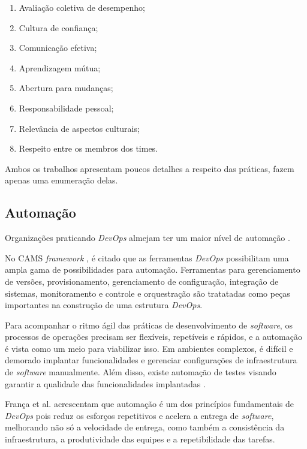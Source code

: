 \begin{enumerate}
\item Avaliação coletiva de desempenho;
\item Cultura de confiança;
\item Comunicação efetiva;
\item Aprendizagem mútua;
\item Abertura para mudanças;
\item Responsabilidade pessoal;
\item Relevância de aspectos culturais;
\item Respeito entre os membros dos times.
\end{enumerate}

Ambos os trabalhos apresentam poucos detalhes a respeito das práticas, fazem
apenas uma enumeração delas.

\subsection{Automação}

Organizações praticando \textit{DevOps} almejam ter um maior nível de automação
\cite{qualitative_devops_journalsw_17}.

No \acrshort{CAMS} \textit{framework} \cite{what_devops_means_2010}, é citado
que as ferramentas \textit{DevOps} possibilitam uma ampla gama de possibilidades
para automação. Ferramentas para gerenciamento de versões, provisionamento,
gerenciamento de configuração, integração de sistemas, monitoramento e controle
e orquestração são tratatadas como peças importantes na construção de uma
estrutura \textit{DevOps}.

Para acompanhar o ritmo ágil das práticas de desenvolvimento de \textit{software}, os
processos de operações precisam ser flexíveis, repetíveis e rápidos, e a
automação é vista como um meio para viabilizar isso. Em ambientes complexos,
é difícil e demorado implantar funcionalidades e gerenciar configurações de
infraestrutura de \textit{software} manualmente. Além disso, existe automação
de testes visando garantir a qualidade das funcionalidades implantadas
\cite{dimensions_of_devops,extending_dimensions}.

França et al. \cite{characterizing_devops} acrescentam que automação é um dos
princípios fundamentais de \textit{DevOps} pois reduz os esforços repetitivos
e acelera a entrega de \textit{software}, melhorando não só a velocidade de
entrega, como também a consistência da infraestrutura, a produtividade das
equipes e a repetibilidade das tarefas.


